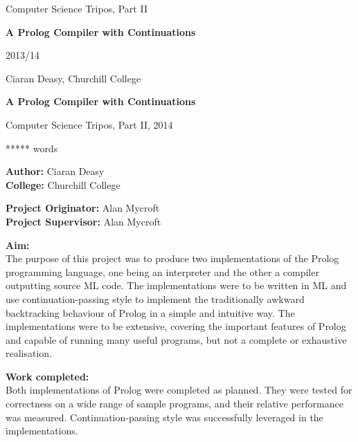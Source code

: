 \documentclass[12pt]{article}
\begin{document}
\thispagestyle{empty}

\medskip
{}
\medskip
{}

\vfil

\centerline{\large Computer Science Tripos, Part II}
\vspace{0.4in}
\centerline{\Large\bf A Prolog Compiler with Continuations}
\vspace{0.3in}
\centerline{\large 2013/14}
\vspace{2.5in}

\newpage
\hspace{5px}
\newpage

\vfil

\centerline{\large Ciaran Deasy, Churchill College}
\vspace{0.4in}
\centerline{\Large\bf A Prolog Compiler with Continuations}
\vspace{0.3in}
\centerline{\large Computer Science Tripos, Part II, 2014}
\vspace{0.1in}
\centerline{ ***** words}
\vspace{0.25in}

{\bf Author:} Ciaran Deasy\\
{\bf College:} Churchill College

\vspace{0.25in}

{\bf Project Originator:} Alan Mycroft\\
{\bf Project Supervisor:} Alan Mycroft

\vspace{0.25in}

{\bf Aim:}\\
The purpose of this project was to produce two implementations of the Prolog programming language, one being an interpreter and the other a compiler outputting source ML code. 
The implementations were to be written in ML and use continuation-passing style to implement the traditionally awkward backtracking behaviour of Prolog in a simple and intuitive way. 
The implementations were to be extensive, covering the important features of Prolog and capable of running many useful programs, but not a complete or exhaustive realisation.

\vspace{0.25in}

{\bf Work completed:}\\
Both implementations of Prolog were completed as planned. 
They were tested for correctness on a wide range of sample programs, and their relative performance was measured. 
Continuation-passing style was successfully leveraged in the implementations.
\end{document}
